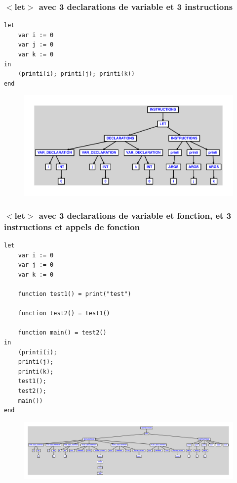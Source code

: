\documentclass{article}
\begin{document}
\subsubsection{$ < $let$ > $ avec 3 declarations de variable et 3 instructions}
\begin{lstlisting}
let
	var i := 0
	var j := 0
	var k := 0
in
	(printi(i); printi(j); printi(k))
end
\end{lstlisting}
\newpage
\begin{figure}[H]
\centering
\includegraphics[max width=\textwidth]{ast/ast_277.pdf}
\end{figure}
\newpage
\subsubsection{$ < $let$ > $ avec 3 declarations de variable et fonction, et 3 instructions et appels de fonction}
\begin{lstlisting}
let
	var i := 0
	var j := 0
	var k := 0

	function test1() = print("test")

	function test2() = test1()

	function main() = test2()
in
	(printi(i);
	printi(j);
	printi(k);
	test1();
	test2();
	main())
end
\end{lstlisting}
\newpage
\begin{figure}[H]
\centering
\includegraphics[max width=\textwidth]{ast/ast_278.pdf}
\end{figure}
\newpage
\end{document}
